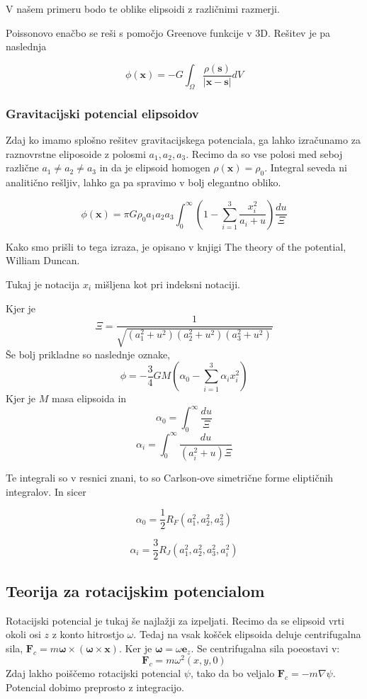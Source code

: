 \documentclass{article}
\theoremstyle{definition}
\theoremstyle{plain}
\numberwithin{definition}{section}
\numberwithin{theorem}{section}
\begin{document}
V našem primeru bodo te oblike elipsoidi z različnimi razmerji.

Poissonovo enačbo se reši s pomočjo Greenove funkcije v 3D. Rešitev je pa
naslednja

$$\phi(\boldsymbol{x}) = -G \int_{\Omega} \frac{\rho(\boldsymbol{s})}{|\boldsymbol{x} - \boldsymbol{s}|}dV$$

\subsubsection{Gravitacijski potencial elipsoidov}
Zdaj ko imamo splošno rešitev gravitacijskega potenciala, ga lahko izračunamo za
raznovrstne eliposoide z polosmi $a_1, a_2, a_3$. Recimo da so vse polosi 
med seboj različne $a_1 \neq a_2 \neq a_3$ in da je
elipsoid homogen $\rho(\boldsymbol{x}) = \rho_0$. 
Integral seveda ni analitično 
rešljiv, lahko ga pa spravimo v bolj elegantno obliko.

$$\phi(\boldsymbol{x}) = \pi G \rho_0 a_1 a_2 a_3 
\int_{0}^{\infty} \left(1 - 
\sum_{i = 1}^{3} \frac{x_{i}^{2}}{a_{i} + u} \right) 
\frac{du}{\Xi}$$

Kako smo prišli to tega izraza, je opisano v knjigi 
The theory of the potential, William Duncan.

Tukaj je notacija $x_i$ mišljena kot pri indeksni notaciji.

Kjer je 
$$\Xi = \frac{1}{\sqrt{(a_1^2 + u^2)(a_2^2 + u^2)(a_3^2 + u^2)}}$$
Še bolj prikladne so naslednje oznake,
$$\phi = -\frac{3}{4} G M \left(\alpha_0 - \sum_{i=1}^{3} \alpha_i x_i^2 \right)$$
Kjer je $M$ masa elipsoida in 
$$\alpha_0 = \int_0^{\infty} \frac{du}{\Xi}$$
$$\alpha_i = \int_0^{\infty} \frac{du}{(a_i^2 + u)\Xi}$$


Te integrali so v resnici znani, to so Carlson-ove simetrične forme
eliptičnih integralov. In sicer

$$\alpha_0 = \frac{1}{2} R_{F}(a_1^2,a_2^2,a_3^2)$$

$$\alpha_i = \frac{3}{2} R_{J}(a_1^2,a_2^2,a_3^2,a_i^2)$$

\subsection{Teorija za rotacijskim potencialom}
Rotacijski potencial je tukaj še najlažji za izpeljati. Recimo da se elipsoid
vrti okoli osi $z$ z konto hitrostjo $\omega$. Tedaj na vsak košček elipsoida
deluje centrifugalna sila, 
$\boldsymbol{F}_c = m \boldsymbol{\omega} \times (\boldsymbol{\omega} \times \boldsymbol{x})$.
Ker je $\boldsymbol{\omega} = \omega \boldsymbol{e}_{z}$. Se centrifugalna
sila poeostavi v:
$$\boldsymbol{F}_{c} = m \omega^2 (x, y, 0)$$
Zdaj lakho poiščemo rotacijski potencial $\psi$,
tako da bo veljalo $\boldsymbol{F}_{c} = - m \nabla \psi$. Potencial dobimo 
preprosto z integracijo. 
\end{document}
